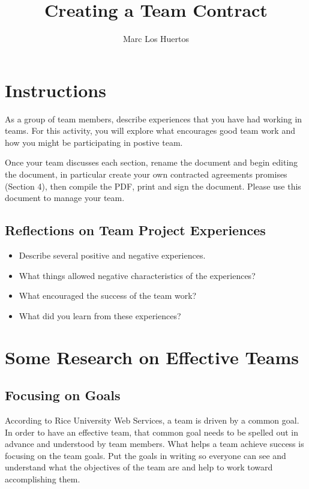 \documentclass{article}\usepackage[]{graphicx}\usepackage[]{color}
\title{Creating a Team Contract}
\author{Marc Los Huertos}
\begin{document}
\maketitle

\section{Instructions}

As a group of team members, describe experiences that you have had working in teams. For this activity, you will explore what encourages good team work and how you might be participating in postive team.

Once your team discusses each section, rename the document and begin editing the document, in particular create your own contracted agreements promises (Section 4), then compile the PDF, print and sign the document. Please use this document to manage your team.

\subsection{Reflections on Team Project Experiences}

\begin{itemize}
  \item Describe several positive and negative experiences.
  \item What things allowed negative characteristics of the experiences?
  \item What encouraged the success of the team work?
  \item What did you learn from these experiences?
\end{itemize}

\section{Some Research on Effective Teams}
\subsection{Focusing on Goals}

According to Rice University Web Services, a team is driven by a common goal. In order to have an effective team, that common goal needs to be spelled out in advance and understood by team members. What helps a team achieve success is focusing on the team goals. Put the goals in writing so everyone can see and understand what the objectives of the team are and help to work toward accomplishing them.
\end{document}
